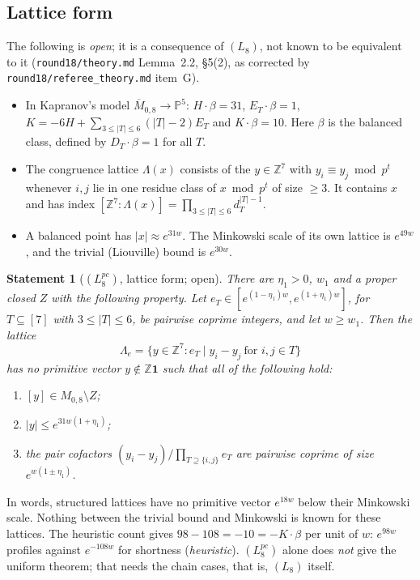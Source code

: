 \documentclass[11pt]{article}
\newtheorem{statement}[theorem]{Statement}
\newcommand{\Z}{\mathbb Z}
\newcommand{\PP}{\mathbb P}
\newcommand{\Mbar}{\overline M_{0,8}}
\newcommand{\rec}[1]{\texttt{#1}}
\begin{document}
\subsection{Lattice form}

The following is \emph{open}; it is a consequence of \((L_8)\), not known to be
equivalent to it (\rec{round18/theory.md} Lemma~2.2, \S5(2), as corrected by
\rec{round18/referee\_theory.md} item~G).
\begin{itemize}[leftmargin=2em]
  \item In Kapranov's model \(\Mbar\to\PP^5\): \(H\cdot\beta=31\),
    \(E_T\cdot\beta=1\), \(K=-6H+\sum_{3\le|T|\le6}(|T|-2)E_T\) and
    \(K\cdot\beta=10\).  Here \(\beta\) is the balanced class, defined by
    \(D_T\cdot\beta=1\) for all \(T\).
  \item The congruence lattice \(\Lambda(x)\) consists of the \(y\in\Z^7\) with
    \(y_i\equiv y_j\bmod p^t\) whenever \(i,j\) lie in one residue class of
    \(x\bmod p^t\) of size \(\ge3\).  It contains \(x\) and has index
    \([\Z^7:\Lambda(x)]=\prod_{3\le|T|\le6}d_T^{|T|-1}\).
  \item A balanced point has \(|x|\approx e^{31w}\).  The Minkowski scale of
    its own lattice is \(e^{49w}\), and the trivial (Liouville) bound is
    \(e^{30w}\).
\end{itemize}

\begin{statement}[\((L_8^{pc})\), lattice form; open]\label{st:L8pc}
There are \(\eta_1>0\), \(w_1\) and a proper closed \(Z\) with the following
property.  Let \(e_T\in[e^{(1-\eta_1)w},e^{(1+\eta_1)w}]\), for
\(T\subseteq[7]\) with \(3\le|T|\le6\), be pairwise coprime integers, and let
\(w\ge w_1\).  Then the lattice
\[
  \Lambda_e=\{y\in\Z^7:e_T\mid y_i-y_j\ \text{for } i,j\in T\}
\]
has no primitive vector \(y\notin\Z\mathbf 1\) such that all of the following
hold:
\begin{enumerate}[label=(\roman*)]
  \item \([y]\in M_{0,8}\setminus Z\);
  \item \(|y|\le e^{31w(1+\eta_1)}\);
  \item the pair cofactors \((y_i-y_j)/\prod_{T\supseteq\{i,j\}}e_T\) are
    pairwise coprime of size \(e^{w(1\pm\eta_1)}\).
\end{enumerate}
\end{statement}

In words, structured lattices have no primitive vector \(e^{18w}\) below their
Minkowski scale.  Nothing between the trivial bound and Minkowski is known for
these lattices.  The heuristic count gives \(98-108=-10=-K\cdot\beta\) per unit
of \(w\): \(e^{98w}\) profiles against \(e^{-108w}\) for shortness
(\emph{heuristic}).  \((L_8^{pc})\) alone does \emph{not} give the uniform
theorem; that needs the chain cases, that is, \((L_8)\) itself.
\end{document}
